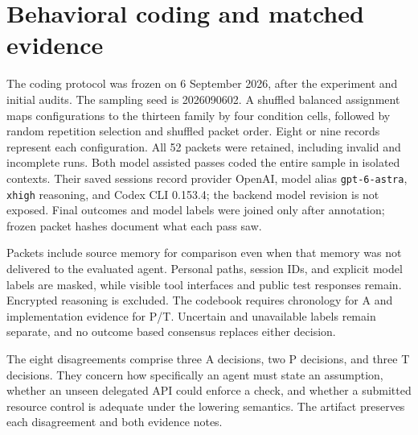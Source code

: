 \section{Behavioral coding and matched evidence}
\label{app:behavior}
The coding protocol was frozen on 6 September 2026, after the experiment and initial audits. The sampling seed is 2026090602. A shuffled balanced assignment maps configurations to the thirteen family by four condition cells, followed by random repetition selection and shuffled packet order. Eight or nine records represent each configuration. All 52 packets were retained, including invalid and incomplete runs. Both model assisted passes coded the entire sample in isolated contexts. Their saved sessions record provider OpenAI, model alias \texttt{gpt-6-astra}, \texttt{xhigh} reasoning, and Codex CLI 0.153.4; the backend model revision is not exposed. Final outcomes and model labels were joined only after annotation; frozen packet hashes document what each pass saw.

Packets include source memory for comparison even when that memory was not delivered to the evaluated agent. Personal paths, session IDs, and explicit model labels are masked, while visible tool interfaces and public test responses remain. Encrypted reasoning is excluded. The codebook requires chronology for A and implementation evidence for P/T. Uncertain and unavailable labels remain separate, and no outcome based consensus replaces either decision.

\begin{table}[ht]
\centering\small
\caption{Full label distributions. ``Paired resolved'' counts records labeled yes or no by both passes. Four-category Cohen's $\kappa$ includes uncertain and unavailable labels and describes the two model-assisted passes; it is not human annotation reliability or label validation.}
\end{table}

The eight disagreements comprise three A decisions, two P decisions, and three T decisions. They concern how specifically an agent must state an assumption, whether an unseen delegated API could enforce a check, and whether a submitted resource control is adequate under the lowering semantics. The artifact preserves each disagreement and both evidence notes.

\begin{table}[htbp]
\centering\small
\caption{Three matched transcript, implementation, and outcome panels, all GPT-5.5 Low/Codex. Quotes are exact saved visible excerpts; implementation summaries refer to final patches. Panel A compares repetitions within C; panels B and C compare conditions in repetition 1. These cases were selected after outcome inspection, separately from the sampled coding.}
\label{tab:cases}
\end{table}

